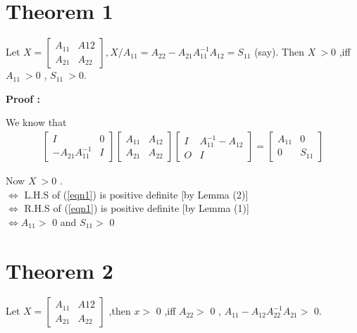\section*{Theorem 1}

Let $X =
\begin{bmatrix}
A_{11}&A{12}\\
A_{21}&A_{22}
\end{bmatrix}
,X / A_{11} = A_{22}-A_{21}A_{11}^{-1}A_{12} = S_{11}$ (say).
Then $X \ > $0 ,iff $A_{11}\ > $0  , $ S_{11} \ > $0.

{\bf Proof :}
 
We know that  
\begin{eqnarray}\label{eqn1}
\begin{bmatrix}I & 0 \\ -A_{21}A_{11}^{-1} & I \end{bmatrix}
\begin{bmatrix}A_{11}&A_{12}\\ A_{21}&A_{22}\end{bmatrix}
\begin{bmatrix}I&A_{11}^{-1}-A_{12}\\ O&I\end{bmatrix}
= 
\begin{bmatrix} A_{11}&0\\0&S_{11}\end{bmatrix}                   
\end{eqnarray}                                                   
 
Now  $X \ > $0 .
\\$\Longleftrightarrow$  L.H.S of (\ref{eqn1}) is positive definite [by Lemma (2)]
\\$\Longleftrightarrow $ R.H.S of (\ref{eqn1}) is positive definite [by Lemma (1)]
\\$\Longleftrightarrow A_{11} > $ 0  and  $ S_{11} > $ 0 


\section*{Theorem 2}
Let $X =
\begin{bmatrix}
A_{11}&A{12}\\
A_{21}&A_{22}
\end{bmatrix}$ 
,then  $ x > $ 0 ,iff $A_{22} > $ 0 , $ A_{11}-A_{12}A_{22}^{-1}A_{21} > $ 0.


